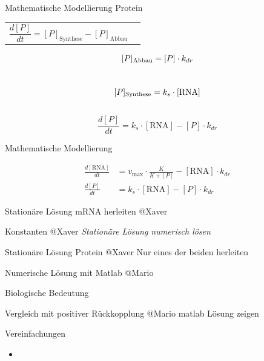 \documentclass[11pt,aspectratio=169,reqno]{beamer}
\begin{document}
\begin{frame}[t]{Mathematische Modellierung Protein}
    \begin{tabular}{l l}
        $\dfrac{d[P]}{dt} =[P]_{\text{Synthese}}-{[P]_{\text{Abbau}}}$ &  \\
    \end{tabular}
    \begin{equation}\notag
        [P]_{\text{Abbau}}=[P] \cdot k_{dr}
    \end{equation}
    \\[16pt]
    \begin{equation}\notag
        [P]_{\text{Synthese}}=k_{s}\cdot[\text{RNA}]
    \end{equation}
    \\[16pt]
    \begin{equation}\tag{2}
        \frac{d[P]}{dt}=k_{s}\cdot[\text{RNA}]-[P] \cdot k_{dr}
    \end{equation}
\end{frame}

\begin{frame}{Mathematische Modellierung}

\begin{align}
    \frac{d[\text{RNA}]}{dt}&=v_{\text{max}}\cdot\frac{K}{K+[P]}-[\text{RNA}] \cdot k_{dr} \tag{1} \\[16pt]
    \frac{d[P]}{dt}&=k_{s}\cdot[\text{RNA}]-[P] \cdot k_{dr} \tag{2}
\end{align}

\end{frame}

\begin{frame}{Stationäre Lösung mRNA herleiten}
@Xaver
\end{frame}

\begin{frame}{Konstanten}
    @Xaver
    \emph{Stationäre Lösung numerisch lösen}
\end{frame}

\begin{frame}{Stationäre Lösung Protein}
@Xaver
Nur eines der beiden herleiten
\end{frame}

\begin{frame}{Numerische Lösung mit Matlab}
@Mario
\end{frame}

\begin{frame}{Biologische Bedeutung}
\end{frame}

\begin{frame}{Vergleich mit positiver Rückkopplung}
@Mario matlab Lösung zeigen
\end{frame}

\begin{frame}{Vereinfachungen}
    \begin{itemize}
        \item 
    \end{itemize}
\end{frame}
\end{document}
